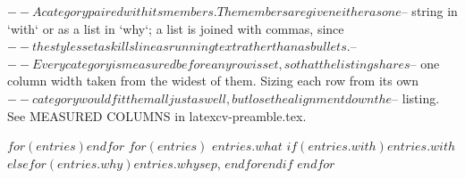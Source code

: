 $-- A category paired with its members. The members are given either as one
$-- string in `with` or as a list in `why`; a list is joined with commas, since
$-- the styles set a skills line as running text rather than as bullets.
$--
$-- Every category is measured before any row is set, so that the listing shares
$-- one column width taken from the widest of them. Sizing each row from its own
$-- category would fit them all just as well, but lose the alignment down the
$-- listing. See MEASURED COLUMNS in latexcv-preamble.tex.
\begin{vitaeskills}%
$for(entries)$$endfor$\cvskillsready%
$for(entries)$
\vitaeskill
  {$entries.what$} %
  {$if(entries.with)$$entries.with$$else$$for(entries.why)$$entries.why$$sep$, $endfor$$endif$} %
$endfor$
\end{vitaeskills}

